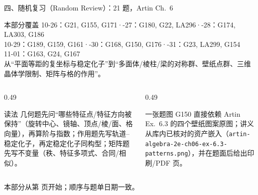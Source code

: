 \documentclass[aspectratio=169,10pt,fontset=none]{ctexbeamer}
\begin{document}
\begin{frame}[t]{四、随机复习（Random Review）：21 题，Artin Ch.~6}
  \label{sec:random}
  \begin{block}{\footnotesize 本部分覆盖}
    \scriptsize
    10-26：G21, G155, G171\quad·-27：G180, G22, LA296\quad·-28：G174, LA303, G186\\
    10-29：G189, G159, G161\quad·-30：G168, G150, G176\quad·-31：G23, LA299, G154\\
    11-01：G163, G24, G167\\[2pt]
    从“平面等距的复坐标与稳定化子”到“多面体/棱柱/梁的对称群、壁纸点群、三维晶体学限制、矩阵与格的作用”。
  \end{block}
  \begin{columns}[T,onlytextwidth]
    \begin{column}{0.49\textwidth}
      \begin{exampleblock}{\footnotesize 读法}
        \scriptsize
        几何题先问“哪些特征点/特征方向被保持”（旋转中心、镜轴、顶点/棱/面、格向量），再算阶与指数；作用题先写轨道–稳定化子，再定稳定化子同构型；矩阵题先写不变量（秩、特征多项式、合同/相似）。
      \end{exampleblock}
    \end{column}
    \begin{column}{0.49\textwidth}
      \begin{block}{\footnotesize 一张题图}
        \scriptsize
        G150 直接依赖 Artin Ex.~6.3 的四个壁纸图案原图；讲义从库内已核对的资产嵌入（\texttt{artin-algebra-2e-ch06-ex-6.3-patterns.png}），并在题面后给出印刷/PDF 页。
      \end{block}
    \end{column}
  \end{columns}
  \vspace{0.2em}
  {\scriptsize\color{ink!70} 本部分从第 \pageref{ex:G21} 页开始；顺序与题单日期一致。}
\end{frame}
\end{document}
